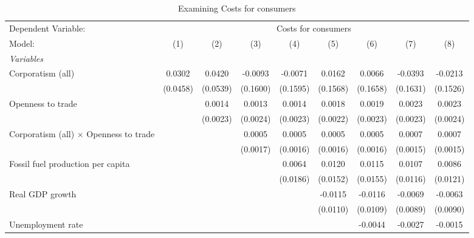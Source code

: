 
\begin{table}[htbp]
   \caption{Examining Costs for consumers}
   \centering
   \begin{tabular}{lcccccccc}
      \tabularnewline \midrule \midrule
      Dependent Variable: & \multicolumn{8}{c}{Costs for consumers}\\
      Model:                                        & (1)      & (2)      & (3)      & (4)      & (5)      & (6)      & (7)      & (8)\\  
      \midrule
      \emph{Variables}\\
      Corporatism (all)                             & 0.0302   & 0.0420   & -0.0093  & -0.0071  & 0.0162   & 0.0066   & -0.0393  & -0.0213\\   
                                                    & (0.0458) & (0.0539) & (0.1600) & (0.1595) & (0.1568) & (0.1658) & (0.1631) & (0.1526)\\   
      Openness to trade                             &          & 0.0014   & 0.0013   & 0.0014   & 0.0018   & 0.0019   & 0.0023   & 0.0023\\   
                                                    &          & (0.0023) & (0.0024) & (0.0023) & (0.0022) & (0.0023) & (0.0023) & (0.0024)\\   
      Corporatism (all) $\times$ Openness to trade  &          &          & 0.0005   & 0.0005   & 0.0005   & 0.0005   & 0.0007   & 0.0007\\   
                                                    &          &          & (0.0017) & (0.0016) & (0.0016) & (0.0016) & (0.0015) & (0.0015)\\   
      Fossil fuel production per capita             &          &          &          & 0.0064   & 0.0120   & 0.0115   & 0.0107   & 0.0086\\   
                                                    &          &          &          & (0.0186) & (0.0152) & (0.0155) & (0.0116) & (0.0121)\\   
      Real GDP growth                               &          &          &          &          & -0.0115  & -0.0116  & -0.0069  & -0.0063\\   
                                                    &          &          &          &          & (0.0110) & (0.0109) & (0.0089) & (0.0090)\\   
      Unemployment rate                             &          &          &          &          &          & -0.0044  & -0.0027  & -0.0015\\   

\end{tabular}
\end{table}
